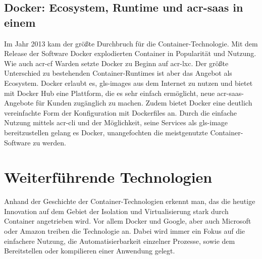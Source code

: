 \subsection{Docker: Ecosystem, Runtime und \gls{acr-saas} in einem}
\label{sec:geschichteDocker}
Im Jahr 2013 kam der größte Durchbruch für die Container-Technologie. Mit dem Release der Software Docker explodierten Container in Popularität und Nutzung. Wie auch \gls{acr-cf} Warden setzte Docker zu Beginn auf \gls{acr-lxc}. Der größte Unterschied zu bestehenden Container-Runtimes ist aber das Angebot als Ecosystem. Docker erlaubt es, \glspl{gls-image} aus dem Internet zu nutzen und bietet mit Docker Hub eine Plattform, die es sehr einfach ermöglicht, neue \gls{acr-saas}-Angebote für Kunden zugänglich zu machen. Zudem bietet Docker eine deutlich vereinfachte Form der Konfiguration mit Dockerfiles an. Durch die einfache Nutzung mittels \gls{acr-cli} und der Möglichkeit, seine Services als \gls{gls-image} bereitzustellen gelang es Docker, unangefochten die meistgenutzte Container-Software zu werden.

\section{Weiterführende Technologien}
\label{sec:timeline}
Anhand der Geschichte der Container-Technologien erkennt man, das die heutige Innovation auf dem Gebiet der Isolation und Virtualisierung stark durch Container angetrieben wird. Vor allem Docker und Google, aber auch Microsoft oder Amazon treiben die Technologie an. Dabei wird immer ein Fokus auf die einfachere Nutzung, die Automatisierbarkeit einzelner Prozesse, sowie dem Bereitstellen oder kompilieren einer Anwendung gelegt.

